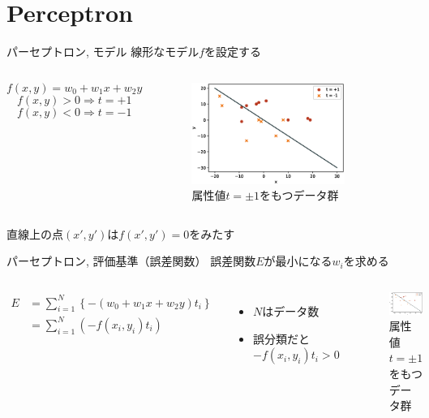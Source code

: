 \documentclass[dvipdfmx,platex]{beamer}
\begin{document}
\section{Perceptron}
\begin{frame}{{\mgfamily パーセプトロン, モデル}}
  線形なモデル$f$を設定する
  \begin{columns}[T,onlytextwidth]
    \[f(x,y)=w_0+w_1x+w_2y\]
    \[f(x,y)>0\Rightarrow t = +1\]
    \[f(x,y)<0\Rightarrow t = -1\]
    \begin{figure}
      \centering
      \includegraphics[width=5cm]{fig/scatter.eps}
      \caption{{\mgfamily 属性値$t=\pm1$をもつデータ群}}
    \end{figure}
  \end{columns}
  直線上の点$(x',y')$は$f(x',y')=0$をみたす
\end{frame}
\begin{frame}{{\mgfamily パーセプトロン, 評価基準（誤差関数）}}
  誤差関数$E$が最小になる$w_i$を求める
  \begin{columns}[T,onlytextwidth]
    \begin{align*}
      E
      &=\sum_{i=1}^{N}{\left\{-\left(w_0+w_1x+w_2y\right)t_i\right\}}\\
      &=\sum_{i=1}^{N}{\left(-f(x_i,y_i)t_i\right)}
    \end{align*}
    \begin{itemize}
    \item $N$はデータ数
    \item 誤分類だと$-f(x_i,y_i)t_i>0$
    \end{itemize}
    \begin{figure}
      \centering
      \includegraphics[width=5cm]{fig/scatter.eps}
      \caption{{\mgfamily 属性値$t=\pm1$をもつデータ群}}
    \end{figure}
  \end{columns}
\end{frame}
\end{document}
